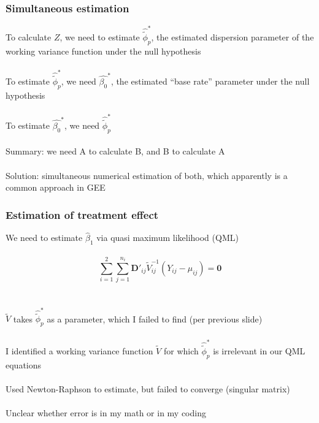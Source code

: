 \documentclass{beamer}
\begin{document}
	     \begin{frame}
		     \frametitle{Simultaneous estimation}
		     To calculate $Z$, we need to estimate
		     $\hat{\tilde{\phi}}^{*}_{p}$, the estimated dispersion
		     parameter of the working variance function under the null
		     hypothesis \\~\\

		     To estimate $\hat{\tilde{\phi}}^{*}_{p}$, we need
		     $\hat{\beta_0}^*$, the estimated ``base rate'' parameter under the
		     null hypothesis \\~\\

		     To estimate $\hat{\beta_0}^*$, we need
		     $\hat{\tilde{\phi}}^{*}_{p}$ \\~\\

		     Summary: we need A to calculate B, and B to calculate A
		     \\~\\

		     Solution: simultaneous numerical estimation of both, which
		     apparently is a common approach in GEE
	     \end{frame}
	     \begin{frame}
		     \frametitle{Estimation of treatment effect} 
		     We need to estimate $\hat{\beta}_1$ via quasi maximum
		     likelihood (QML) \\~\\ 
		     $$
	\sum_{i=1}^2 \sum_{j=1}^{n_i} \bm{D}'_{ij} \tilde{V}_{ij}^{-1}(Y_{ij}-\mu_{ij})
	= \bm{0}
		     $$ \\~\\

		     $\tilde{V}$ takes $\hat{\tilde{\phi}}^{*}_{p}$ as a
		     parameter, which I failed to find (per previous slide)
		     \\~\\

		     I identified a working variance function
		     $\tilde{V}$ for which $\hat{\tilde{\phi}}^{*}_{p}$ is
		     irrelevant in our QML equations \\~\\

		     Used Newton-Raphson to estimate, but failed to converge
		     (singular matrix) \\~\\

		     Unclear whether error is in my math or in my coding
	     \end{frame}
\end{document}
